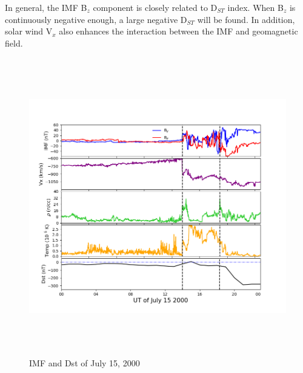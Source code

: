 \documentclass[12pt, letterpaper]{article} %
\begin{document}
In general, the IMF B$_z$ component is closely related to D$_{ST}$  index. When B$_z$ is continuously negative enough, a large negative D$_{ST}$  will be found. In addition, solar wind V$_x$ also enhances the interaction between the IMF and geomagnetic field. 

\begin{figure}[!t] %
\begin{center} %
  \includegraphics[width=13cm,height=13cm]{imf_dst.png} %
  \caption{IMF and Dst of July 15, 2000} %
  \label{png:imf_dst} %
\end{center} %
\end{figure} %



\end{document}
